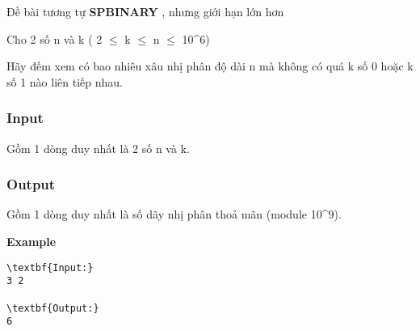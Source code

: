 



   Đề bài tương tự   \textbf{    SPBINARY   }   , nhưng giới hạn lớn hơn  

   Cho 2 số n và k ( 2 $\le$ k  $\le$  n  $\le$  10^6)  

   Hãy đếm xem có bao nhiêu xâu nhị phân độ dài n mà không có quá k số 0 hoặc k số 1 nào liên tiếp nhau.  

\subsubsection{   Input  }

   Gồm 1 dòng duy nhất là 2 số n và k.  

\subsubsection{   Output  }

   Gồm 1 dòng duy nhất là số dãy nhị phân thoả mãn (module 10^9).  

\textbf{    Example   }
\begin{verbatim}
\textbf{Input:}
3 2

\textbf{Output:}
6\end{verbatim}
